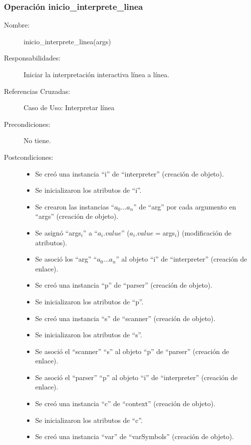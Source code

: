 \subsubsection{Operación inicio\_interprete\_linea}
\FloatBarrier
\begin{framed}
	\begin{description}
		\item [Nombre:] inicio\_interprete\_linea(args)
		\item [Responsabilidades:] Iniciar la interpretación interactiva línea a línea.
		\item [Referencias Cruzadas: ] Caso de Uso: Interpretar línea
      \item [Precondiciones:] No tiene.
      \item [Postcondiciones:] \hfill
      \begin {itemize}
         \item Se creó una instancia ``i'' de ``interpreter'' (creación de objeto).
         \item Se inicializaron los atributos de ``i''.
         \item Se crearon las instancias ``$a_0...a_n$'' de ``arg'' por cada argumento en ``args'' (creación de objeto).
         \item Se asignó ``args$_i$'' a ``$a_i.value$'' ($a_i.value = $args$_i$) (modificación de atributos).
         \item Se asoció los ``arg'' ``$a_0...a_n$'' al objeto ``i'' de ``interpreter'' (creación de enlace).
         \item Se creó una instancia ``p'' de ``parser'' (creación de objeto).
         \item Se inicializaron los atributos de ``p''.
         \item Se creó una instancia ``s'' de ``scanner'' (creación de objeto).
         \item Se inicializaron los atributos de ``s''.
         \item Se asoció el ``scanner'' ``s'' al objeto ``p'' de ``parser'' (creación de enlace).
         \item Se asoció el ``parser'' ``p'' al objeto ``i'' de ``interpreter'' (creación de enlace).
         \item Se creó una instancia ``c'' de ``context'' (creación de objeto).
         \item Se inicializaron los atributos de ``c''.
         \item Se creó una instancia ``var'' de ``varSymbols'' (creación de objeto).

\end{itemize}
\end{description}
\end{framed}
